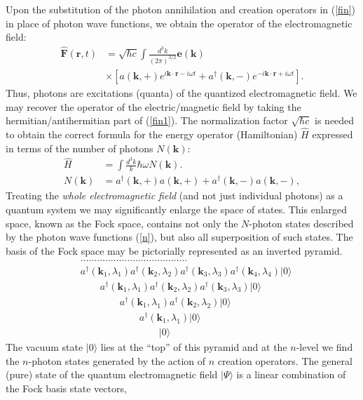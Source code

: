 \documentclass[twocolumn,aps,pra,10pt]{revtex4-1}
\begin{document}
Upon the substitution of the photon annihilation and creation operators in (\ref{fin}) in place of photon wave functions, we obtain the operator of the electromagnetic field:
\begin{align}\label{fin1}
{\hat{\bm F}}(\bm r,t)&=\sqrt{\hbar c}\int\!\frac{d^3k}{(2\pi)^{3/2}}{\bm e}(\bm k)\nonumber\\
&\times\left[a({\bm k},+)e^{i\bm k\cdot\bm r-i\omega t}+a^\dagger({\bm k},-)e^{-i\bm k\cdot\bm r+i\omega t}\right].
\end{align}
Thus, photons are excitations (quanta) of the quantized electromagnetic field. We may recover the operator of the electric/magnetic field by taking the hermitian/antihermitian part of (\ref{fin1}). The normalization factor $\sqrt{\hbar c}$ is needed to obtain the correct formula for the energy operator (Hamiltonian) $\hat{H}$ expressed in terms of the number of photons $N(\bm k)$:
\begin{align}
\hat{H}&=\int\!\frac{d^3k}{k}\hbar\omega N(\bm k).\label{ham}\\
N(\bm k)&=a^\dagger({\bm k},+)a({\bm k},+)+a^\dagger({\bm k},-)a({\bm k},-),\label{nn}
\end{align}
Treating the {\em whole electromagnetic field} (and not just individual photons) as a quantum system we may significantly enlarge the space of states. This enlarged space, known as the Fock space, contains not only the $N$-photon states described by the photon wave functions (\ref{n}), but also all superposition of such states. The basis of the Fock space may be pictorially represented as an inverted pyramid.
\begin{align}\label{fock}
&\dots\dots\dots\dots\dots\dots\dots\dots\dots\dots\dots\dots\dots\nonumber\\
&a^\dagger({\bm k}_1,\lambda_1)a^\dagger({\bm k}_2,\lambda_2)a^\dagger({\bm k}_3,\lambda_3)a^\dagger({\bm k}_4,\lambda_4)|0\rangle\nonumber\\
&\quad\quad a^\dagger({\bm k}_1,\lambda_1)a^\dagger({\bm k}_2,\lambda_2)a^\dagger({\bm k}_3,\lambda_3)|0\rangle\nonumber\\
&\quad\quad\quad\quad a^\dagger({\bm k}_1,\lambda_1)a^\dagger({\bm k}_2,\lambda_2)|0\rangle\nonumber\\
&\quad\quad\quad\quad\quad\quad a^\dagger({\bm k}_1,\lambda_1)|0\rangle\nonumber\\
&\quad\quad\quad\quad\quad\quad\quad\quad|0\rangle
\end{align}
The vacuum state $|0\rangle$ lies at the ``top'' of this pyramid and at the $n$-level we find the $n$-photon states generated by the action of $n$ creation operators. The general (pure) state of the quantum electromagnetic field $|\Psi\rangle$ is a linear combination of the Fock basis state vectors,
\end{document}
